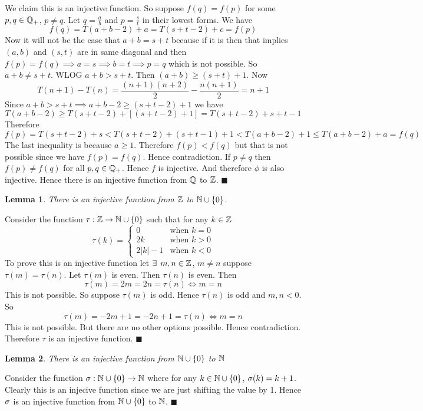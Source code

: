 \documentclass[a4paper, 11pt]{article}
\newtheorem{lemma}{Lemma}
\renewenvironment{proof}{\noindent{\it \textbf{Proof:}}\hspace*{1em}}{\hfill $\blacksquare$\bigskip\\}
\begin{document}
{\begin{itemize}
\begin{proof}
 We claim this is an injective function. So suppose $f(q)=f(p)$ for some $p,q\in\mathbb{Q}_+$, $ p\neq q$. Let $q=\frac{a}{b}$ and $p=\frac{s}{t}$ in their lowest forms. We have $$f(q)=T(a+b-2)+a=T(s+t-2)+c=f(p)$$Now it will not be the case that $a+b=s+t$ because if it is then that implies $(a,b)$ and $(s,t)$ are in same diagonal and then $f(p)=f(q)\implies a=s\implies b=t\implies p=q$ which is not possible. So $a+b\neq s+t$. WLOG $a+b>s+t$. Then $(a+b)\geq (s+t)+1$. Now $$T(n+1)-T(n)=\frac{(n+1)(n+2)}2-\frac{n(n+1)}2=n+1$$ Since $a+b>s+t\implies a+b-2\geq (s+t-2)+1$ we have $$T(a+b-2)\geq T(s+t-2)+[(s+t-2)+1]=T(s+t-2)+s+t-1$$Therefore $$f(p)=T(s+t-2)+s< T(s+t-2)+(s+t-1)+1<T(a+b-2)+1\leq T(a+b-2)+a=f(q)$$The last inequality is because $a\geq 1$. Therefore $f(p)<f(q)$ but that is not possible since we have $f(p)=f(q)$. Hence contradiction. If $p\neq q $ then $f(p)\neq f(q)$ for all $p,q\in\mathbb{Q}_+$. Hence $f$ is injective. And therefore $\phi$ is also injective. Hence there is an injective function from $\mathbb{Q}$ to $\mathbb{Z}$.
\end{proof}
\begin{lemma}\label{ztoninj}
	There is an injective function from $\mathbb{Z}$ to $\mathbb{N}\cup \{0\}$. 
\end{lemma}
\begin{proof}
	Consider the function $\tau:\mathbb{Z}\to \mathbb{N}\cup\{0\}$ such that for any $k\in\mathbb{Z}$ $$\tau(k)=\begin{cases}
		0&\text{when $k=0$}\\
		2k & \text{when $k>0$}\\
		2|k|-1 & \text{when $k<0$}
	\end{cases}$$To prove this is an injective function let $\exists$ $m,n\in \mathbb{Z}$, $m\neq n$ suppose $\tau(m)=\tau(n)$. Let $\tau(m)$ is even. Then $\tau(n)$ is even. Then $$\tau(m)=2m=2n=\tau(n)\iff m=n$$ This is not possible. So suppose $\tau(m)$ is odd. Hence $\tau(n)$ is odd and $m,n<0$. So $$\tau(m)=-2m+1=-2n+1=\tau(n)\iff m=n$$This is not possible. But there are no other options possible. Hence contradiction. Therefore $\tau$ is an injective function.
\end{proof}
\begin{lemma}\label{n0toninj}
	There is an injective function from $\mathbb{N}\cup\{0\}$ to $\mathbb{N}$
\end{lemma}
\begin{proof}
	Consider the function $\sigma:\mathbb{N}\cup\{0\}\to \mathbb{N}$ where for any $k\in \mathbb{N}\cup \{0\}$, $\sigma(k)=k+1$. Clearly this is an injecive function since we are just shifting the value by 1. Hence $\sigma$ is an injective function from $\mathbb{N}\cup\{0\}$ to $\mathbb{N}$. 
\end{proof}


\end{itemize}}
\end{document}
